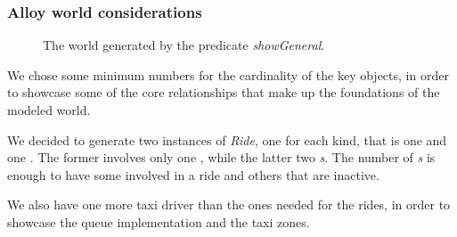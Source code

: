 \begin{landscape}
\subsubsection{Alloy world considerations} %
\label{ssub:alloy-world-considerations}
\begin{figure}[h!t]
\caption{The world generated by the predicate \emph{showGeneral}.}
	\noindent{}
\centering
\end{figure}
\end{landscape}

We chose some minimum numbers for the cardinality of the key objects, in order to showcase some of the core relationships that make up the foundations of the modeled world.

We decided to generate two instances of \emph{Ride}, one for each kind, that is one \emph{} and one \emph{}. The former involves only one \emph{}, while the latter two \emph{s}. 
The number of \emph{s} is enough to have some involved in a ride and others that are inactive.

We also have one more taxi driver than the ones needed for the rides, in order to showcase the queue implementation and the taxi zones.


